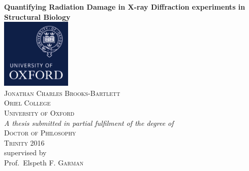 \begin{titlepage}
	\centering
	{\huge\bfseries Quantifying Radiation Damage in X-ray Diffraction experiments in Structural Biology\\}
	\vspace{1.0cm}
	\includegraphics[width=0.25\textwidth]{figures/titlepage/ox_brand_cmyk_pos.pdf}\\
	\vspace{1.0cm}
	\vfill
	{\scshape\normalsize Jonathan Charles Brooks-Bartlett\\}
	{\scshape\normalsize Oriel College\\}
	{\scshape\normalsize University of Oxford\\}
	\vspace{1.0cm}
	\vfill
	{\normalsize\itshape A thesis submitted in partial fulfilment of the degree of\\}
	{\scshape\normalsize Doctor of Philosophy\\}
	{\scshape\normalsize Trinity 2016\\}
	\vspace{1.0cm}
	supervised by\\
	Prof.~Elspeth \textsc{F. Garman}
\end{titlepage}
